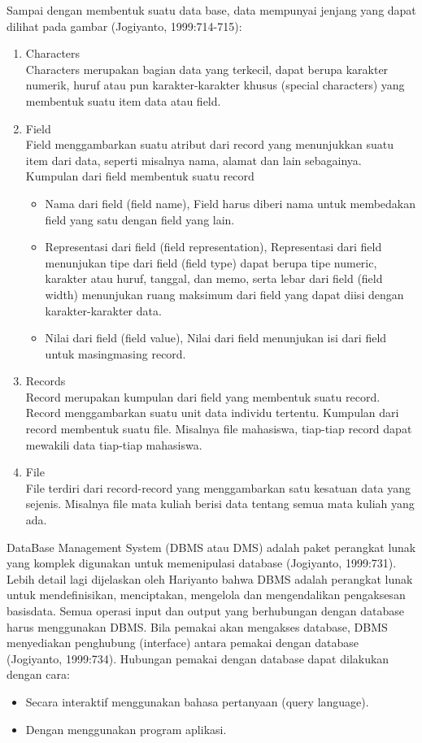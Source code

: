 Sampai dengan membentuk suatu data base, data mempunyai jenjang yang dapat dilihat pada gambar (Jogiyanto, 1999:714-715): 
\begin{enumerate}
	\item Characters
	\hfill\\
	Characters merupakan bagian data yang terkecil, dapat berupa karakter numerik, huruf atau pun karakter-karakter khusus (special characters) yang membentuk suatu item data atau field.
	
	\item Field
	\hfill\\
	Field menggambarkan suatu atribut dari record yang menunjukkan suatu item dari data, seperti misalnya nama, alamat dan lain sebagainya. Kumpulan dari field membentuk suatu record
	\begin{itemize}
	\item Nama dari field (field name), Field harus diberi nama untuk membedakan field yang satu dengan field yang lain.
	\item Representasi dari field (field representation), Representasi dari field menunjukan tipe dari field (field type) dapat berupa tipe numeric, karakter atau huruf, tanggal, dan memo, serta lebar dari field (field width) menunjukan ruang maksimum dari field yang dapat diisi dengan karakter-karakter data.
	\item Nilai dari field (field value), Nilai dari field menunjukan isi dari field untuk masingmasing record.
	\end{itemize}
	
	\item Records
	\hfill\\
	Record merupakan kumpulan dari field yang membentuk suatu record. Record menggambarkan suatu unit data individu  tertentu. Kumpulan dari record membentuk suatu file. Misalnya file mahasiswa, tiap-tiap record dapat mewakili data tiap-tiap mahasiswa.
	
	\item File
	\hfill\\
	File terdiri dari record-record yang menggambarkan satu kesatuan data yang sejenis. Misalnya file mata kuliah berisi data tentang semua mata kuliah yang ada.
\end{enumerate}

DataBase Management System (DBMS atau DMS) adalah paket perangkat lunak yang komplek digunakan untuk memenipulasi  database (Jogiyanto, 1999:731). Lebih detail lagi dijelaskan oleh Hariyanto bahwa DBMS adalah perangkat lunak untuk mendefinisikan, menciptakan, mengelola dan mengendalikan pengaksesan basisdata. Semua operasi input dan output yang berhubungan dengan database harus menggunakan DBMS. Bila pemakai akan mengakses database, DBMS menyediakan penghubung (interface) antara pemakai dengan database (Jogiyanto, 1999:734). Hubungan pemakai dengan database dapat dilakukan dengan cara:
\begin{itemize}
\item Secara interaktif menggunakan bahasa pertanyaan (query language).
\item Dengan menggunakan program aplikasi.
\end{itemize}

